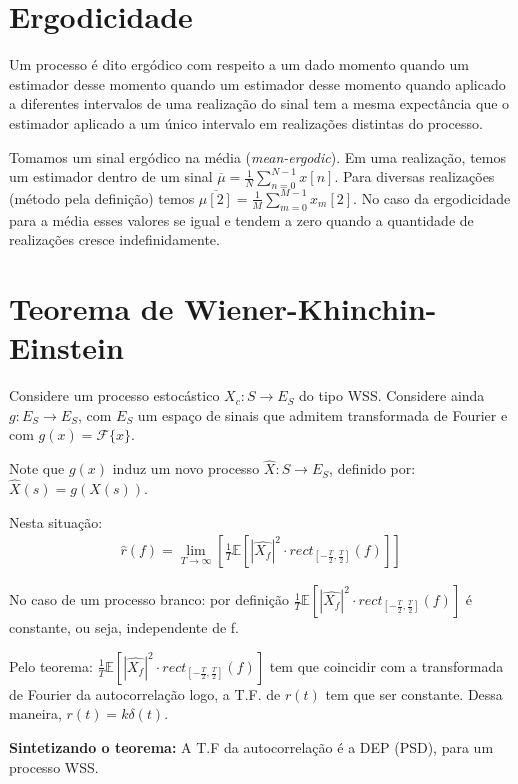 \documentclass{article}
\begin{document}
\setlength{\abovedisplayskip}{12pt}
\setlength{\belowdisplayskip}{12pt}
\setlength{\abovedisplayshortskip}{0pt}
\setlength{\belowdisplayshortskip}{0pt}
\setlength{\jot}{1pt}

\section{Ergodicidade}
Um processo é dito ergódico com respeito a um dado momento quando um estimador desse momento quando
um estimador desse momento quando aplicado a diferentes intervalos de uma realização do sinal tem a
mesma expectância que o estimador aplicado a um único intervalo em realizações distintas do
processo.

Tomamos um sinal ergódico na média (\textit{mean-ergodic}). Em uma realização, temos um estimador
dentro de um sinal $\overline{\mu} = \frac{1}{N} \sum_{n=0}^{N-1} x[n]$. Para diversas realizações
(método pela definição) temos $\overline{\mu[2]} = \frac{1}{M} \sum_{m=0}^{M-1} x_m[2]$. No caso da
ergodicidade para a média esses valores se igual e tendem a zero quando a quantidade de realizações
cresce indefinidamente.

\vspace{1em}
\section{Teorema de Wiener-Khinchin-Einstein}
Considere um processo estocástico $X_c: S \to E_S$ do tipo WSS. Considere ainda $g: E_S \to E_S$,
com $E_S$ um espaço de sinais que admitem transformada de Fourier e com $g(x) = \mathcal{F}\{x\}$.

Note que $g(x)$ induz um novo processo $\widehat{X}: S \to E_S$, definido por: $\widehat{X}(s) =
g(X(s))$.

Nesta situação:
\begin{align*}
    \widehat{r}(f) = \lim_{T \to \infty} \left[ \frac{1}{T} \mathbb{E}[|\widehat{X_f}|^2 \cdot
rect_{[-\frac{T}{2}, \frac{T}{2}]}(f)] \right] \end{align*}

\vspace{0.25em}
No caso de um processo branco: por definição $\frac{1}{T} \mathbb{E}[|\widehat{X_f}|^2 \cdot
rect_{[-\frac{T}{2}, \frac{T}{2}]}(f)]$ é constante, ou seja, independente de f.

Pelo teorema: $\frac{1}{T} \mathbb{E}[|\widehat{X_f}|^2 \cdot
rect_{[-\frac{T}{2}, \frac{T}{2}]}(f)]$ tem que coincidir com a transformada de Fourier da
autocorrelação logo, a T.F. de $r(t)$ tem que ser constante. Dessa maneira, $r(t) = k \delta(t)$.

\textbf{Sintetizando o teorema:} A T.F da autocorrelação é a DEP (PSD), para um processo WSS.
\end{document}
